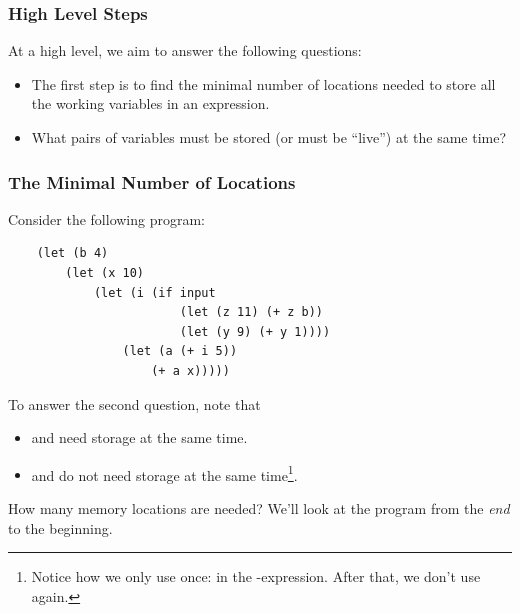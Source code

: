 \subsubsection{High Level Steps}
At a high level, we aim to answer the following questions:
\begin{itemize}
    \item The first step is to find the minimal number of locations needed to store all the working variables in an expression.
    \item What pairs of variables must be stored (or must be ``live'') at the same time? 
\end{itemize}

\subsubsection{The Minimal Number of Locations}
Consider the following program: 
\begin{verbatim}
    (let (b 4)
        (let (x 10)
            (let (i (if input 
                        (let (z 11) (+ z b))
                        (let (y 9) (+ y 1))))
                (let (a (+ i 5))
                    (+ a x)))))\end{verbatim}
To answer the second question, note that 
\begin{itemize}
    \item {} and  need storage at the same time.
    \item {} and  do not need storage at the same time\footnote{Notice how we only use  once: in the -expression. After that, we don't use  again.}. 
\end{itemize}
How many memory locations are needed? We'll look at the program from the \emph{end} to the beginning.
